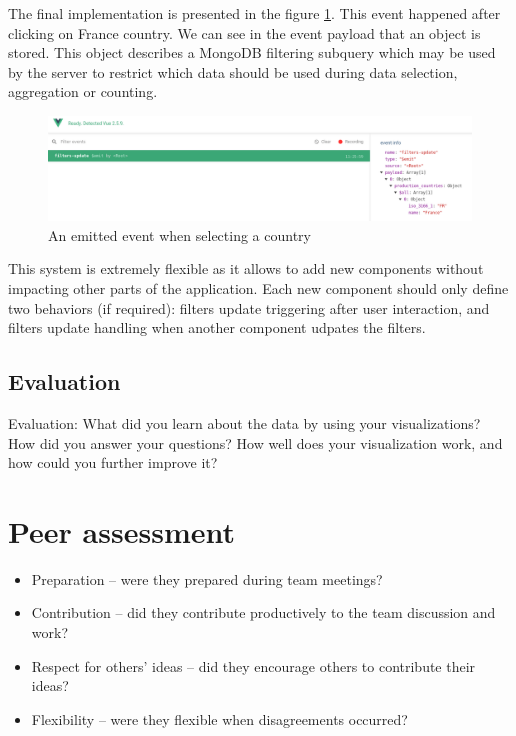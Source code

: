 \documentclass[a4paper,10pt]{article}
\begin{document}
The final implementation is presented in the figure \ref{fig:screen-filtering}.
This event happened after clicking on France country. We can see in the event
payload that an object is stored. This object describes a MongoDB filtering subquery
which may be used by the server to restrict which data should be used during data
selection, aggregation or counting.

\begin{figure}[ht]
   \centering
   \includegraphics[width=1\linewidth]{images/screens/filtering-example.png}
  \caption{An emitted event when selecting a country} \label{fig:screen-filtering}
\end{figure}

This system is extremely flexible as it allows to add new components without impacting
other parts of the application. Each new component should only define two behaviors (if required):
filters update triggering after user interaction, and filters update handling when
another component udpates the filters.

\subsection{Evaluation}

Evaluation: What did you learn about the data by using your visualizations? How did you answer your questions? How well does your visualization work, and how could you further improve it?

\section{Peer assessment}

\begin{itemize}
  \item Preparation – were they prepared during team meetings?
  \item Contribution – did they contribute productively to the team discussion and work?
  \item Respect for others’ ideas – did they encourage others to contribute their ideas?
  \item Flexibility – were they flexible when disagreements occurred?
\end{itemize}

\setlength{\parskip}{0.1\baselineskip}

\listoffigures
\end{document}
